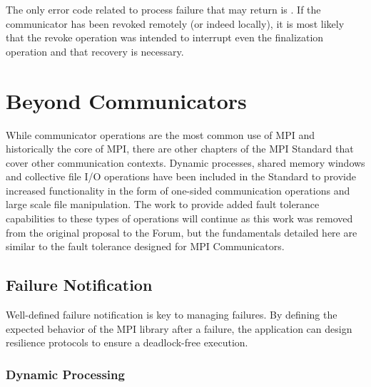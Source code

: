 The only error code related to process failure that 
may return is . If the communicator has been revoked
remotely (or indeed locally), it is most likely that the revoke operation was
intended to interrupt even the finalization operation and that recovery is
necessary.

\section{Beyond Communicators}
\label{sec:ulfm:beyond}

While communicator operations are the most common use of MPI and historically
the core of MPI, there are other chapters of the MPI Standard that cover other
communication contexts. Dynamic processes, shared memory windows and collective 
file I/O operations have been included in the Standard to provide increased 
functionality in the form of one-sided communication operations and large scale 
file manipulation. The work to provide added fault tolerance capabilities to 
these types of operations will continue as this work was removed from the original proposal to the \mpi Forum, but the fundamentals detailed here are similar to the  fault tolerance designed for MPI Communicators.

\subsection{Failure Notification}
\label{subsec:ulfm:beyond:notification}

Well-defined failure notification is key to managing failures. By defining the
expected behavior of the MPI library after a failure, the application can design
resilience protocols to ensure a deadlock-free execution.

\subsubsection{Dynamic Processing}

